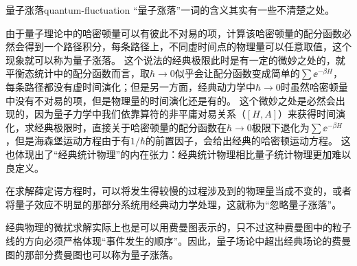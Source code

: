 \begin{back}{量子涨落}{quantum-fluctuation}
    “量子涨落”一词的含义其实有一些不清楚之处。

    由于量子理论中的哈密顿量可以有彼此不对易的项，计算该哈密顿量的配分函数必然会得到一个路径积分，每条路径上，不同虚时间点的物理量可以任意取值，这个现象就可以称为量子涨落。
    这个说法的经典极限此时是有一定的微妙之处的，就平衡态统计中的配分函数而言，取$\hbar \to 0$似乎会让配分函数变成简单的$\sum \ee^{-\beta H}$，每条路径都没有虚时间演化；但是另一方面，经典动力学中$\hbar \to 0$时虽然哈密顿量中没有不对易的项，但是物理量的时间演化还是有的。
    这个微妙之处是必然会出现的，因为量子力学中我们依靠算符的非平庸对易关系（$[H, A]$）来获得时间演化，求经典极限时，直接关于哈密顿量的配分函数在$\hbar \to 0$极限下退化为$\sum \ee^{-\beta H}$，但是海森堡运动方程由于有$1/\hbar$的前置因子，会给出经典的哈密顿运动方程。
    这也体现出了“经典统计物理”的内在张力：经典统计物理相比量子统计物理更加难以良定义。

    在求解薛定谔方程时，可以将发生得较慢的过程涉及到的物理量当成不变的，或者将量子效应不明显的那部分系统用经典动力学处理，这就称为“忽略量子涨落”。

    经典物理的微扰求解实际上也是可以用费曼图表示的，只不过这种费曼图中的粒子线的方向必须严格体现“事件发生的顺序”。因此，量子场论中超出经典场论的费曼图的那部分费曼图也可以称为量子涨落。
\end{back}

